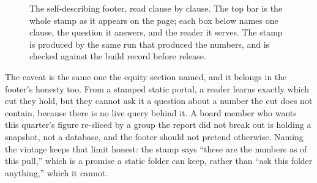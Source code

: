 \documentclass[
    a4paper,
    fontsize=10pt,
    twoside=true,
    numbers=noenddot,
]{kaobook}
\begin{document}
\begin{figure}[htbp]
\centering
{}
\caption[Anatomy of a self-describing footer]{The self-describing footer, read clause by clause. The top bar is the whole stamp as it appears on the page; each box below names one clause, the question it answers, and the reader it serves. The stamp is produced by the same run that produced the numbers, and is checked against the build record before release.}
\label{fig:ch12-viz-footer}
\end{figure}

The caveat is the same one the equity section named, and it belongs in the footer's honesty too. From a stamped static portal, a reader learns exactly which cut they hold, but they cannot ask it a question about a number the cut does not contain, because there is no live query behind it. A board member who wants this quarter's figure re-sliced by a group the report did not break out is holding a snapshot, not a database, and the footer should not pretend otherwise. Naming the vintage keeps that limit honest: the stamp says \enquote{these are the numbers as of this pull,} which is a promise a static folder can keep, rather than \enquote{ask this folder anything,} which it cannot.
\end{document}

